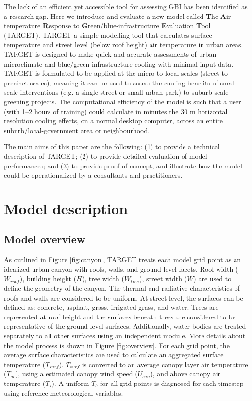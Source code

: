 \documentclass[gmd, manuscript]{copernicus}
\begin{document}
The lack of an efficient yet accessible tool for assessing GBI has been identified as a research gap. Here we introduce and evaluate a new model called \textbf{T}he \textbf{A}ir-temperature \textbf{R}esponse to \textbf{G}reen/blue-infrastructure \textbf{E}valuation \textbf{T}ool (TARGET). TARGET a simple modelling tool that calculates surface temperature and street level (below roof height) air temperature in urban areas. TARGET is designed to make quick and accurate assessments of urban microclimate and blue/green infrastructure cooling with minimal input data. TARGET is formulated to be applied at the micro-to-local-scales (street-to-precinct scales); meaning it can be used to assess the cooling benefits of small scale interventions (e.g. a single street or small urban park) to suburb scale greening projects. The computational efficiency of the model is such that a user (with 1--2 hours of training) could calculate in minutes the 30 m horizontal resolution  cooling effects, on a normal desktop computer, across an entire suburb/local-government area or neighbourhood. 

The main aims of this paper are the following: (1) to provide a technical description of TARGET; (2) to provide detailed evaluation of model performances; and (3) to provide proof of concept, and illustrate how the model could be operationalized  by a consultants and practitioners.



\section{Model description}\label{sec:ModelOverview}
\subsection{Model overview}

As outlined in Figure \ref{fig:canyon}, TARGET treats each model grid point as an idealized urban canyon with roofs, walls, and  ground-level facets.   Roof width ($W_{roof}$), building  height ($H$), tree width ($W_{tree}$),  street width ($W$)  are used to define the geometry of the canyon. The thermal and radiative characteristics of roofs and walls are considered to be uniform. At street level, the surfaces  can be defined as: concrete, asphalt, grass, irrigated grass, and water. Trees are represented at roof height and the surfaces beneath trees are considered to be representative of the ground level surfaces. Additionally, water bodies are treated separately to all other surfaces using an independent  module. More details about the model process is shown in Figure \ref{fig:overview}. For each grid point, the average surface characteristics are used to calculate an aggregated surface temperature ($T_{surf}$). $T_{surf}$ is converted to an average canopy layer air temperature ($T_{ac}$), using a estimated canopy wind speed ($U_{can}$), and above canopy air temperature (\ensuremath{T_{b}}).  A uniform \ensuremath{T_{b}} for all grid points is diagnosed for each timestep using reference meteorological variables. 
\end{document}
